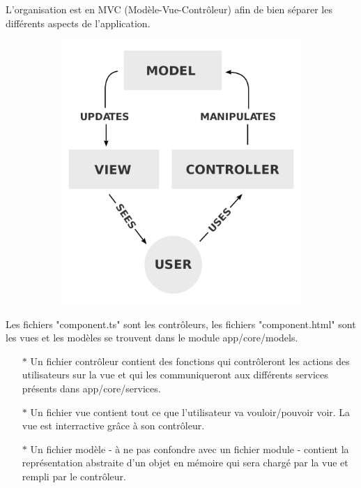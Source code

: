 \documentclass{article}
\begin{document}
L'organisation est en MVC (Modèle-Vue-Contrôleur) afin de bien séparer les différents aspects de l'application.
\newline
\begin{figure}[h!]
	\centering
  	\begin{subfigure}[b]{0.45\linewidth}
    \includegraphics[width=\linewidth]{mvc.png}
  	\end{subfigure}
\end{figure}
\newline
Les fichiers "component.ts" sont les contrôleurs, les fichiers "component.html" sont les vues et les modèles se trouvent dans le module app/core/models.
\begin{itemize}
	\item[$\ast$]Un fichier contrôleur contient des fonctions qui contrôleront les actions des utilisateurs sur la vue et qui les communiqueront aux différents services présents dans app/core/services.
	\item[$\ast$]Un fichier vue contient tout ce que l'utilisateur va vouloir/pouvoir voir. La vue est interractive grâce à son contrôleur.
	\item[$\ast$]Un fichier modèle - à ne pas confondre avec un fichier module - contient la représentation abstraite d'un objet en mémoire qui sera chargé par la vue et rempli par le contrôleur.
\end{itemize}
\end{document}
